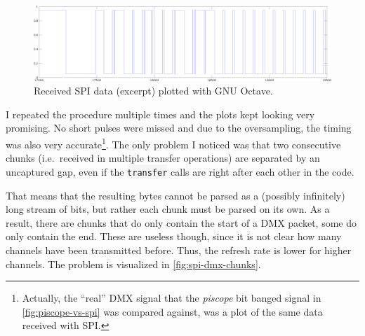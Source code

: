 \begin{figure}
\centering
\includegraphics[width=1.00000\textwidth]{Bilder/octave-spi.png}
\caption[Received SPI data (excerpt) plotted with GNU
Octave]{Received SPI data (excerpt) plotted with GNU
Octave.}\label{fig:octave-spi}
\end{figure}

I repeated the procedure multiple times and the plots kept looking very
promising. No short pulses were missed and due to the oversampling, the
timing was also very accurate\footnote{Actually, the ``real'' DMX signal
  that the \emph{piscope} bit banged signal in \cref{fig:piscope-vs-spi}
  was compared against, was a plot of the same data received with SPI.}.
The only problem I noticed was that two consecutive chunks
(i.e.~received in multiple transfer operations) are separated by an
uncaptured gap, even if the \colorbox{WhiteSmoke}{\lstinline!transfer!} calls are right after
each other in the code.

That means that the resulting bytes cannot be parsed as a (possibly
infinitely) long stream of bits, but rather each chunk must be parsed on
its own. As a result, there are chunks that do only contain the start of
a DMX packet, some do only contain the end. These are useless though,
since it is not clear how many channels have been transmitted before.
Thus, the refresh rate is lower for higher channels. The problem is
visualized in
\cref{fig:spi-dmx-chunks}.


